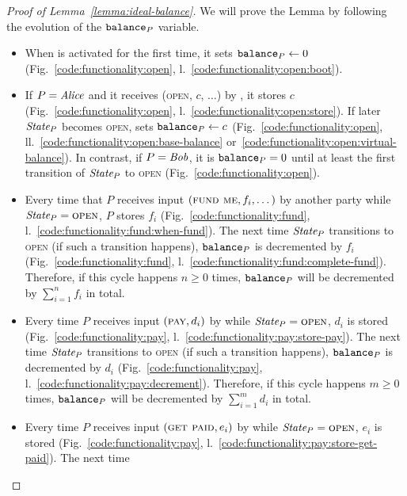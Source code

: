 \begin{proof}[Proof of Lemma~\ref{lemma:ideal-balance}]
  We will prove the Lemma by following the evolution of the $\texttt{balance}_{P}$
  variable.
  \begin{itemize}
    \item When \fchan is activated for the first time, it sets $\texttt{balance}_{P}
    \gets 0$ (Fig.~\ref{code:functionality:open},
    l.~\ref{code:functionality:open:boot}). \item If $P = \mathit{Alice}$ and it
    receives (\textsc{open}, $c$, $\dots$) by \environment, it stores $c$
    (Fig.~\ref{code:functionality:open},
    l.~\ref{code:functionality:open:store}). If later $\itistate_P$ becomes
    \textsc{open}, \fchan sets $\texttt{balance}_{P} \gets c$
    (Fig.~\ref{code:functionality:open},
    ll.~\ref{code:functionality:open:base-balance}
    or~\ref{code:functionality:open:virtual-balance}). In contrast, if $P =
    \mathit{Bob}$, it is $\texttt{balance}_{P} = 0$ until at least the first transition of
    $\itistate_P$ to \textsc{open} (Fig.~\ref{code:functionality:open}).
    \item Every time that $P$ receives input $(\textsc{fund me}, f_i, \dots)$ by
    another party while $\itistate_P = \textsc{open}$, $P$ stores $f_i$
    (Fig.~\ref{code:functionality:fund},
    l.~\ref{code:functionality:fund:when-fund}). The next time $\itistate_P$
    transitions to \textsc{open} (if such a transition happens), $\texttt{balance}_{P}$
    is decremented by $f_i$ (Fig.~\ref{code:functionality:fund},
    l.~\ref{code:functionality:fund:complete-fund}). Therefore, if this cycle
    happens $n \geq 0$ times, $\texttt{balance}_{P}$ will be decremented by
    $\sum\limits_{i=1}^n f_i$ in total.
    \item Every time $P$ receives input $(\textsc{pay}, d_i)$ by \environment
    while $\itistate_P = \textsc{open}$, $d_i$ is stored
    (Fig.~\ref{code:functionality:pay},
    l.~\ref{code:functionality:pay:store-pay}). The next time
    $\itistate_P$ transitions to \textsc{open} (if such a transition happens),
    $\texttt{balance}_{P}$ is decremented by $d_i$
    (Fig.~\ref{code:functionality:pay},
    l.~\ref{code:functionality:pay:decrement}). Therefore, if this cycle
    happens $m \geq 0$ times, $\texttt{balance}_{P}$ will be decremented by
    $\sum\limits_{i=1}^m d_i$ in total.
    \item Every time $P$ receives input $(\textsc{get paid}, e_i)$ by
    \environment while $\itistate_P = \textsc{open}$, $e_i$ is stored
    (Fig.~\ref{code:functionality:pay},
    l.~\ref{code:functionality:pay:store-get-paid}). The next time

\end{itemize}
\end{proof}
